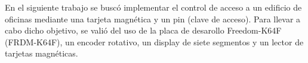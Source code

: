 En el siguiente trabajo se buscó implementar el control de acceso a un edificio de oficinas mediante una tarjeta magnética y un pin (clave de acceso). Para llevar a cabo dicho objetivo, se valió del uso de la placa de desarollo Freedom-K64F (FRDM-K64F), un encoder rotativo, un display de siete segmentos y un lector de tarjetas magnéticas.